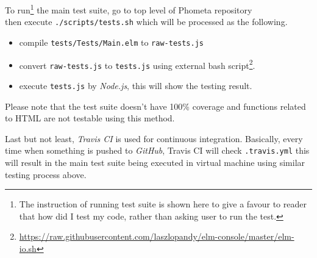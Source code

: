 \documentclass[master.tex]{subfiles}
\begin{document}
To run\footnote{The instruction of running test suite is shown here to give a
  favour to reader that how did I test my code, rather than asking user to run
  the test.} the main test suite, go to top level of Phometa repository\\ then
execute \texttt{./scripts/tests.sh} which will be processed as the following.
\begin{itemize}
\item compile \texttt{tests/Tests/Main.elm} to \texttt{raw-tests.js}
\item convert \texttt{raw-tests.js} to \texttt{tests.js} using external bash
  script\footnote{\url{https://raw.githubusercontent.com/laszlopandy/elm-console/master/elm-io.sh}}.
\item execute \texttt{tests.js} by \emph{Node.js}, this will show the testing result.
\end{itemize}

Please note that the test suite doesn't have 100\% coverage and functions
related to HTML are not testable using this method.

Last but not least, \emph{Travis CI} is used for continuous integration.
Basically, every time when something is pushed to \emph{GitHub}, Travis CI will
check \texttt{.travis.yml} this will result in the main test suite being
executed in virtual machine using similar testing process above.
\end{document}
